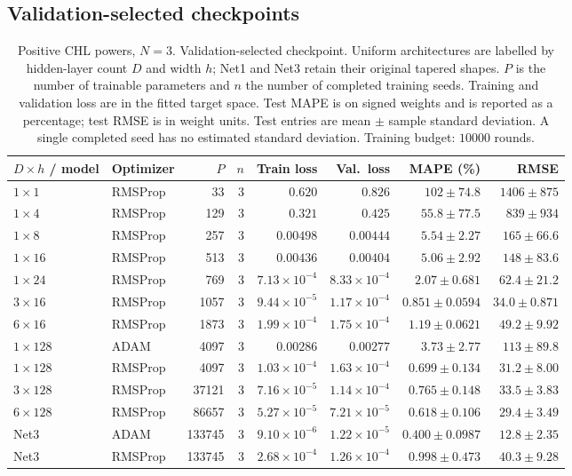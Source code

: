 \subsection{Validation-selected checkpoints}
\begin{table}[!htbp]
\centering
\small
\setlength{\tabcolsep}{4pt}
\renewcommand{\arraystretch}{1.18}
\begin{tabular}{@{}llrrrrrr@{}}
\toprule
$D\times h$ / model & Optimizer & $P$ & $n$ & Train loss & Val.\ loss & MAPE (\%) & RMSE \\
\midrule
$1\times 1$ & RMSProp & 33 & 3 & $0.620$ & $0.826$ & $102\pm74.8$ & $1406\pm875$ \\
$1\times 4$ & RMSProp & 129 & 3 & $0.321$ & $0.425$ & $55.8\pm77.5$ & $839\pm934$ \\
$1\times 8$ & RMSProp & 257 & 3 & $0.00498$ & $0.00444$ & $5.54\pm2.27$ & $165\pm66.6$ \\
$1\times 16$ & RMSProp & 513 & 3 & $0.00436$ & $0.00404$ & $5.06\pm2.92$ & $148\pm83.6$ \\
$1\times 24$ & RMSProp & 769 & 3 & $7.13\times10^{-4}$ & $8.33\times10^{-4}$ & $2.07\pm0.681$ & $62.4\pm21.2$ \\
$3\times 16$ & RMSProp & 1057 & 3 & $9.44\times10^{-5}$ & $1.17\times10^{-4}$ & $0.851\pm0.0594$ & $34.0\pm0.871$ \\
$6\times 16$ & RMSProp & 1873 & 3 & $1.99\times10^{-4}$ & $1.75\times10^{-4}$ & $1.19\pm0.0621$ & $49.2\pm9.92$ \\
$1\times 128$ & ADAM & 4097 & 3 & $0.00286$ & $0.00277$ & $3.73\pm2.77$ & $113\pm89.8$ \\
$1\times 128$ & RMSProp & 4097 & 3 & $1.03\times10^{-4}$ & $1.63\times10^{-4}$ & $0.699\pm0.134$ & $31.2\pm8.00$ \\
$3\times 128$ & RMSProp & 37121 & 3 & $7.16\times10^{-5}$ & $1.14\times10^{-4}$ & $0.765\pm0.148$ & $33.5\pm3.83$ \\
$6\times 128$ & RMSProp & 86657 & 3 & $5.27\times10^{-5}$ & $7.21\times10^{-5}$ & $0.618\pm0.106$ & $29.4\pm3.49$ \\
Net3 & ADAM & 133745 & 3 & $9.10\times10^{-6}$ & $1.22\times10^{-5}$ & $0.400\pm0.0987$ & $12.8\pm2.35$ \\
Net3 & RMSProp & 133745 & 3 & $2.68\times10^{-4}$ & $1.26\times10^{-4}$ & $0.998\pm0.473$ & $40.3\pm9.28$ \\
\bottomrule
\end{tabular}
\caption{\textsf{Positive CHL powers, $N=3$. Validation-selected checkpoint. Uniform architectures are labelled by hidden-layer count $D$ and width $h$; Net1 and Net3 retain their original tapered shapes. $P$ is the number of trainable parameters and $n$ the number of completed training seeds. Training and validation loss are in the fitted target space. Test MAPE is on signed weights and is reported as a percentage; test RMSE is in weight units. Test entries are mean $\pm$ sample standard deviation. A single completed seed has no estimated standard deviation. Training budget: $10000$ rounds.}}
\label{tab:depth-chl-N3-positive-integer-best}
\end{table}

